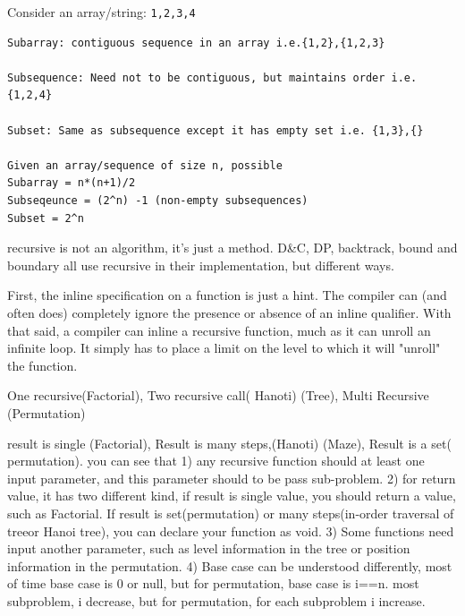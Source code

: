 \documentclass[a4paper,11pt,twoside]{book}
\begin{document}
	\par Consider an array/string: \texttt{{1,2,3,4}}
\begin{lstlisting}
Subarray: contiguous sequence in an array i.e.{1,2},{1,2,3}

Subsequence: Need not to be contiguous, but maintains order i.e. {1,2,4}

Subset: Same as subsequence except it has empty set i.e. {1,3},{}

Given an array/sequence of size n, possible
Subarray = n*(n+1)/2
Subseqeunce = (2^n) -1 (non-empty subsequences)
Subset = 2^n
\end{lstlisting}
	

	\par recursive is not an algorithm, it's just a method. D\&C, DP, backtrack, bound and boundary all use recursive in their implementation, but different ways. 
	
	\par First, the inline specification on a function is just a hint. The compiler can (and often does) completely ignore the presence or absence of an inline qualifier. With that said, a compiler can inline a recursive function, much as it can unroll an infinite loop. It simply has to place a limit on the level to which it will "unroll" the function.

	\par One recursive(Factorial),  Two recursive call( Hanoti) (Tree), Multi Recursive (Permutation)

	\par result is single (Factorial), Result is many steps,(Hanoti) (Maze), Result is a set( permutation). you can see that 1) any recursive function should at least one input parameter, and this parameter should to be pass sub-problem. 2) for return value, it has two different kind, if result is single value, you should return a value, such as Factorial. If result is set(permutation) or many steps(in-order traversal of treeor Hanoi tree), you can declare your function as void. 3) Some functions need input another parameter, such as level information in the tree or position information in the permutation. 4) Base case can be understood differently, most of time base case is 0 or null, but for permutation, base case is i==n.  most subproblem, i decrease, but for permutation, for each subproblem i increase. 
	
\end{document}
